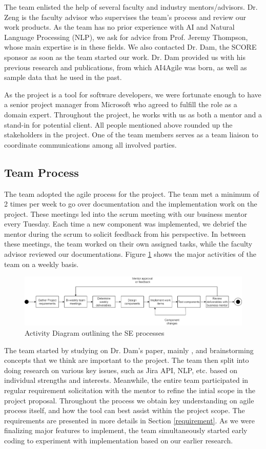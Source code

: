 The team enlisted the help of several faculty and industry mentors/advisors. Dr. Zeng is the faculty advisor who supervises the team's process and review our work products. As the team has no prior experience with AI and Natural Language Processing (NLP), we ask for advice from Prof. Jeremy Thompson, whose main expertise is in these fields. We also contacted Dr. Dam, the SCORE sponsor as soon as the team started our work. Dr. Dam provided us with his previous research and publications, from which AI4Agile was born, as well as sample data that he used in the past. 

As the project is a tool for software developers, we were fortunate enough to have a senior project manager from Microsoft who agreed to fulfill the role as a domain expert. Throughout the project, he works with us as both a mentor and a stand-in for potential client. All people mentioned above rounded up the stakeholders in the project. One of the team members serves as a team liaison to coordinate communications among all involved parties.

\subsection{Team Process}
The team adopted the agile process for the project. The team met a minimum of 2 times per week to go over documentation and the implementation work on the project. These meetings led into the scrum meeting with our business mentor every Tuesday. Each time a new component was implemented, we debrief the mentor during the scrum to solicit feedback from his perspective. In between these meetings, the team worked on their own assigned tasks, while the faculty advisor reviewed our documentations. Figure \ref{fig:acd} shows the major activities of the team on a weekly basis. 

\begin{figure}
\centering
\includegraphics[width=\textwidth,keepaspectratio]{./figure/ActivityDiagram.png}
\caption{Activity Diagram outlining the SE processes}
\label{fig:acd}
\end{figure}

The team started by studying on Dr. Dam's paper, mainly \cite{dam1}, and brainstorming concepts that we think are important to the project. The team then split into doing research on various key issues, such as Jira API, NLP, etc. based on individual strengths and interests. Meanwhile, the entire team participated in regular requirement solicitation with the mentor to refine the intial scope in the project proposal. Throughout the process we obtain key understanding on agile process itself, and how the tool can best assist within the project scope. The requirements are presented in more details in Section \ref{requirement}. As we were finalizing major features to implement, the team simultaneously started early coding to experiment with implementation based on our earlier research. 

